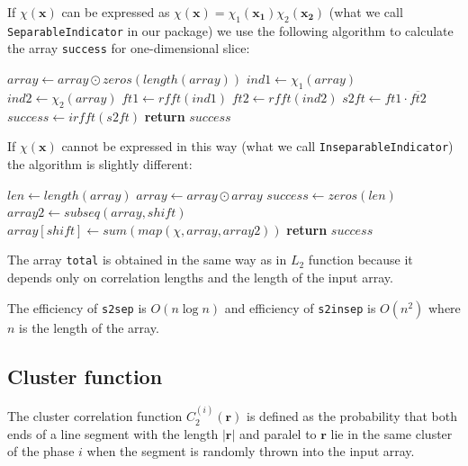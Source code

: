 \documentclass[reprint,amsmath,amssymb,aps,pre]{revtex4-1}
\newcommand{\code}[1]{\colorbox{light-gray}{\texttt{#1}}}
\begin{document}
If $\chi(\bm{x})$ can be expressed as
$\chi(\bm{x}) = \chi_1(\bm{x_1})\chi_2(\bm{x_2})$ (what we call
\code{SeparableIndicator} in our package) we use the following algorithm to
calculate the array \code{success} for one-dimensional slice:
\begin{algorithmic}[1]
    \State $array \gets array \odot zeros(length(array))$ 
  \EndIf
  \State $ind1 \gets \chi_1(array)$ 
  \State $ind2 \gets \chi_2(array)$ 
  \State $ft1 \gets rfft(ind1)$ 
  \State $ft2 \gets rfft(ind2)$
  \State $s2ft \gets ft1 \cdot \overline{ft2}$ 
  \State $success \gets irfft(s2ft)$ 
  \State \textbf{return} $success$
  \EndProcedure
\end{algorithmic}

If $\chi(\bm{x})$ cannot be expressed in this way (what we call
\code{InseparableIndicator}) the algorithm is slightly different:
\begin{algorithmic}[1]
    \State $len \gets length(array)$
      \State $array \gets array \odot array$
    \EndIf
    \State $success \gets zeros(len)$
      \State $array2 \gets subseq(array, shift)$
      \State $array[shift] \gets sum(map(\chi, array, array2))$
    \EndFor
    \State \textbf{return} $success$
  \EndProcedure
\end{algorithmic}

The array \code{total} is obtained in the same way as in $L_2$ function because
it depends only on correlation lengths and the length of the input array.

The efficiency of \code{s2sep} is $O(n\log n)$ and efficiency of
\code{s2insep} is $O(n^2)$ where $n$ is the length of the array.

\subsection{Cluster function}
The cluster correlation function $C_2^{(i)}(\bm{r})$ is defined as the
probability that both ends of a line segment with the length $|\bm{r}|$ and
paralel to $\bm{r}$ lie in the same cluster of the phase $i$ when the segment is
randomly thrown into the input array.
\end{document}
